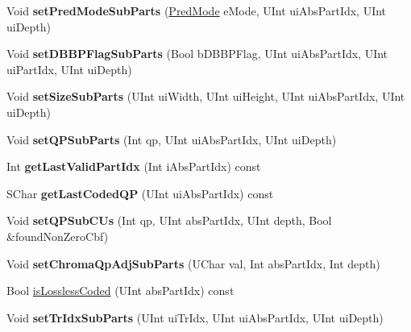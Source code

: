 \begin{DoxyCompactItemize}
Void {\bfseries set\+Pred\+Mode\+Sub\+Parts} (\hyperlink{_type_def_8h_a33d1666f1cc95252c96e39584255954e}{Pred\+Mode} e\+Mode, U\+Int ui\+Abs\+Part\+Idx, U\+Int ui\+Depth)
\item 
\mbox{\label{class_t_com_data_c_u_affc154ccf4828e3074885f373e706be6}} 
Void {\bfseries set\+D\+B\+B\+P\+Flag\+Sub\+Parts} (Bool b\+D\+B\+B\+P\+Flag, U\+Int ui\+Abs\+Part\+Idx, U\+Int ui\+Part\+Idx, U\+Int ui\+Depth)
\item 
\mbox{\label{class_t_com_data_c_u_abc50d6425c08270a36461064c70501f7}} 
Void {\bfseries set\+Size\+Sub\+Parts} (U\+Int ui\+Width, U\+Int ui\+Height, U\+Int ui\+Abs\+Part\+Idx, U\+Int ui\+Depth)
\item 
\mbox{\label{class_t_com_data_c_u_ac3246302ce9953c0a35844064172ffd4}} 
Void {\bfseries set\+Q\+P\+Sub\+Parts} (Int qp, U\+Int ui\+Abs\+Part\+Idx, U\+Int ui\+Depth)
\item 
\mbox{\label{class_t_com_data_c_u_a36403968ff69fd621af8a5fbc58190a6}} 
Int {\bfseries get\+Last\+Valid\+Part\+Idx} (Int i\+Abs\+Part\+Idx) const
\item 
\mbox{\label{class_t_com_data_c_u_a1c9a6303fca104cbd9d26fa23cbbe601}} 
S\+Char {\bfseries get\+Last\+Coded\+QP} (U\+Int ui\+Abs\+Part\+Idx) const
\item 
\mbox{\label{class_t_com_data_c_u_a695d2280a09196f506fc7339061bcb46}} 
Void {\bfseries set\+Q\+P\+Sub\+C\+Us} (Int qp, U\+Int abs\+Part\+Idx, U\+Int depth, Bool \&found\+Non\+Zero\+Cbf)
\item 
\mbox{\label{class_t_com_data_c_u_a1210a93f9a08238e3b87045f9259d089}} 
Void {\bfseries set\+Chroma\+Qp\+Adj\+Sub\+Parts} (U\+Char val, Int abs\+Part\+Idx, Int depth)
\item 
Bool \hyperlink{class_t_com_data_c_u_af89be4f7cbe9f6b2ea8e5ab1fb917364}{is\+Lossless\+Coded} (U\+Int abs\+Part\+Idx) const
\item 
\mbox{\label{class_t_com_data_c_u_abe96242b8451ac1643a53d4fd21dea43}} 
Void {\bfseries set\+Tr\+Idx\+Sub\+Parts} (U\+Int ui\+Tr\+Idx, U\+Int ui\+Abs\+Part\+Idx, U\+Int ui\+Depth)

\end{DoxyCompactItemize}
